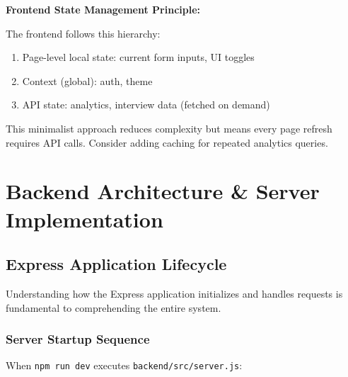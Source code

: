 \documentclass[12pt,a4paper,oneside]{article}
\newcommand{\fileref}[1]{\texttt{#1}}
\begin{document}
\begin{importantbox}
\textbf{Frontend State Management Principle:}

The frontend follows this hierarchy:
\begin{enumerate}
    \item Page-level local state: current form inputs, UI toggles
    \item Context (global): auth, theme
    \item API state: analytics, interview data (fetched on demand)
\end{enumerate}

This minimalist approach reduces complexity but means every page refresh requires API calls. Consider adding caching for repeated analytics queries.
\end{importantbox}

\newpage


\section{Backend Architecture \& Server Implementation}

\subsection{Express Application Lifecycle}

Understanding how the Express application initializes and handles requests is fundamental to comprehending the entire system.

\subsubsection{Server Startup Sequence}

When \texttt{npm run dev} executes \fileref{backend/src/server.js}:
\end{document}
